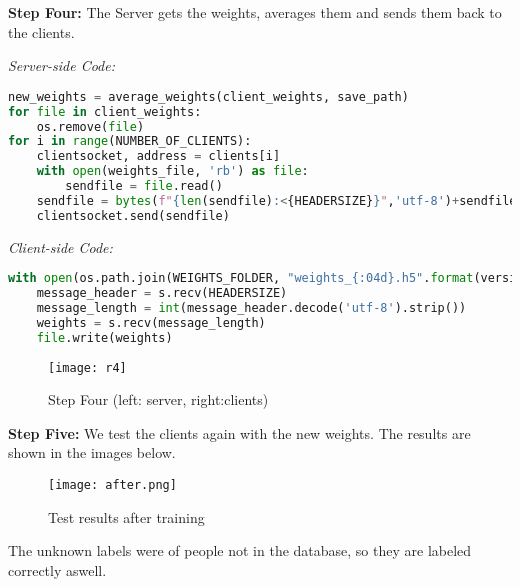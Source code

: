 \textbf{Step Four:} The Server gets the weights, averages them and sends them back to the clients. 

\textit{Server-side Code:}

\begin{center}{\begin{minipage}{0.9\linewidth}
\begin{lstlisting}[language=Python, basicstyle=\fontsize{10}{10}\selectfont\ttfamily]
new_weights = average_weights(client_weights, save_path)
for file in client_weights:
    os.remove(file)
for i in range(NUMBER_OF_CLIENTS):
    clientsocket, address = clients[i]
    with open(weights_file, 'rb') as file:
        sendfile = file.read()
    sendfile = bytes(f"{len(sendfile):<{HEADERSIZE}}",'utf-8')+sendfile
    clientsocket.send(sendfile)
\end{lstlisting}
\end{minipage}}\end{center}

\textit{Client-side Code:}

\begin{center}{\begin{minipage}{0.9\linewidth}
\begin{lstlisting}[language=Python, basicstyle=\fontsize{10}{10}\selectfont\ttfamily]
with open(os.path.join(WEIGHTS_FOLDER, "weights_{:04d}.h5".format(version+1)),'wb') as file:
    message_header = s.recv(HEADERSIZE)
    message_length = int(message_header.decode('utf-8').strip())
    weights = s.recv(message_length)
    file.write(weights)
\end{lstlisting}
\end{minipage}}\end{center}

\begin{figure}[H]
	\centering
	\texttt{[image: r4]}
	\caption{Step Four (left: server, right:clients)}
	\label{f10}
\end{figure}

\textbf{Step Five:} We test the clients again with the new weights. The results are shown in the images below. 

\begin{figure}[H]
	\centering
	\texttt{[image: after.png]}
	\caption{Test results after training}
	\label{f10}
\end{figure}

The unknown labels were of people not in the database, so they are labeled correctly aswell. 


